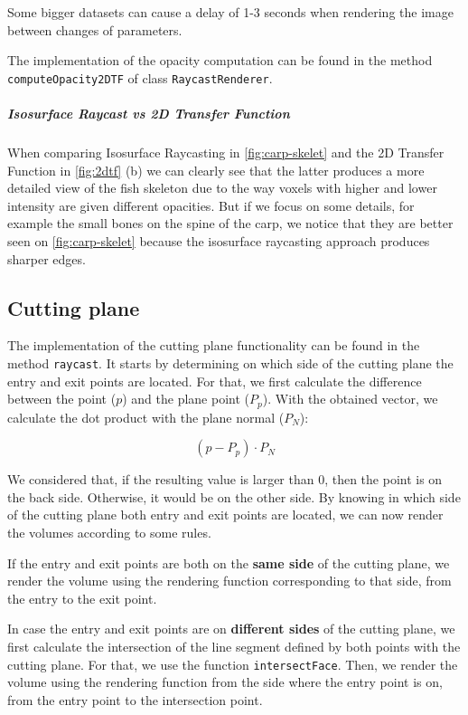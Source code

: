 \documentclass[a4paper]{article}
\begin{document}
Some bigger datasets can cause a delay of 1-3 seconds when rendering the image between changes of parameters.

The implementation of the opacity computation can be found in the method {\tt computeOpacity2DTF} of class {\tt RaycastRenderer}.

\subparagraph{Isosurface Raycast vs 2D Transfer Function}

When comparing Isosurface Raycasting in \autoref{fig:carp-skelet} and the 2D Transfer Function in \autoref{fig:2dtf} (b) we can clearly see that the latter produces a more detailed view of the fish skeleton due to the way voxels with higher and lower intensity are given different opacities. But if we focus on some details, for example the small bones on the spine of the carp, we notice that they are better seen on \autoref{fig:carp-skelet} because the isosurface raycasting approach produces sharper edges.

\subsection{Cutting plane}

The implementation of the cutting plane functionality can be found in the method {\tt raycast}. It starts by determining on which side of the cutting plane the entry and exit points are located. For that, we first calculate the difference between the point ($p$) and the plane point ($P_p$). With the obtained vector, we calculate the dot product with the plane normal ($P_N$):

$$(p-P_p)\cdot P_N$$

We considered that, if the resulting value is larger than 0, then the point is on the back side. Otherwise, it would be on the other side. By knowing in which side of the cutting plane both entry and exit points are located, we can now render the volumes according to some rules.

If the entry and exit points are both on the \textbf{same side} of the cutting plane, we render the volume using the rendering function corresponding to that side, from the entry to the exit point.

In case the entry and exit points are on \textbf{different sides} of the cutting plane, we first calculate the intersection of the line segment defined by both points with the cutting plane. For that, we use the function {\tt intersectFace}. Then, we render the volume using the rendering function from the side where the entry point is on, from the entry point to the intersection point.
\end{document}
